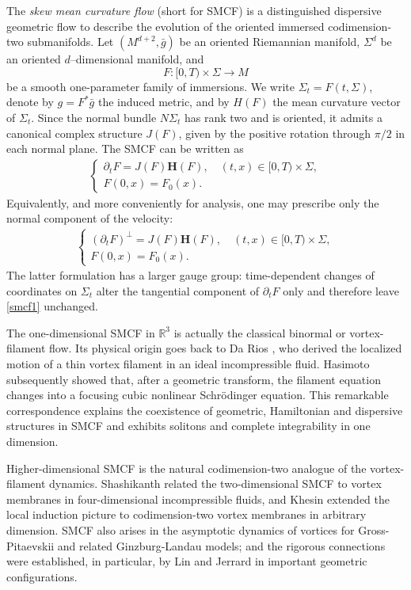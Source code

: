 \documentclass[11pt,letterpaper,reqno]{amsart}
\numberwithin{equation}{section}
\newcommand{\R}{\mathbb R}
\theoremstyle{definition}
\theoremstyle{remark}
\begin{document}
  The
\emph{skew mean curvature flow} (short for SMCF) is a distinguished dispersive geometric flow to describe the evolution of the oriented immersed codimension-two submanifolds.  Let $(M^{d+2},\bar g)$ be an oriented
Riemannian manifold, $\Sigma^d$ be an oriented $d$--dimensional manifold, and
\[
 F:[0,T)\times\Sigma\longrightarrow M
\]
be a smooth one-parameter family of immersions.  We write
$\Sigma_t=F(t,\Sigma)$, denote by $g=F^\ast\bar g$ the induced metric, and by
$H(F)$ the mean curvature vector of $\Sigma_t$.  Since the normal bundle
$N\Sigma_t$ has rank two and is oriented, it admits a canonical complex structure
$J(F)$, given by the positive rotation through $\pi/2$ in each normal plane.  The
SMCF can be written as
\begin{align} \label{smcf}
	\begin{cases}
\displaystyle
		\partial_t F=J(F) \mathbf{H}(F), \quad(t, x) \in [0, T) \times \Sigma, \\
		F(0, x)=F_0(x).
	\end{cases}
\end{align}
Equivalently, and more conveniently for analysis, one may prescribe only the normal
component of the velocity:
\begin{align}  \label{smcf1}
	\begin{cases}
\displaystyle
		(	\partial_t F)^{\perp}=J(F) \mathbf{H}(F), \quad(t, x) \in [0, T)\times \Sigma, \\
		F(0, x)=F_0(x).
	\end{cases}
\end{align}
The latter formulation has a larger gauge group: time-dependent changes of
coordinates on $\Sigma_t$ alter the tangential component of $\partial_tF$ only and
therefore leave \eqref{smcf1} unchanged.





The one-dimensional SMCF in $\R^3$ is actually the classical binormal or vortex-filament
flow.  Its physical origin  goes back to Da Rios \cite{DA}, who derived the localized motion
of a thin vortex filament in an ideal incompressible fluid.  Hasimoto \cite{Ha72} subsequently
showed that, after a geometric transform, the filament equation  changes into a
focusing cubic nonlinear Schr\"odinger equation.  This remarkable correspondence
explains the coexistence of geometric, Hamiltonian and dispersive structures in
SMCF and exhibits solitons and complete integrability in one dimension.

Higher-dimensional SMCF is the natural codimension-two analogue of the vortex-filament
dynamics.  Shashikanth \cite{Sha12} related the two-dimensional SMCF to vortex membranes in
four-dimensional incompressible fluids, and Khesin \cite{Khe12} extended the local induction
picture to codimension-two vortex membranes in arbitrary dimension.  SMCF also
arises in the asymptotic dynamics of vortices for Gross-Pitaevskii and related
Ginzburg-Landau models; and the rigorous connections were established, in particular, by
Lin \cite{Lin98,Lin20} and Jerrard \cite{Jerrard} in important geometric configurations.
\end{document}
